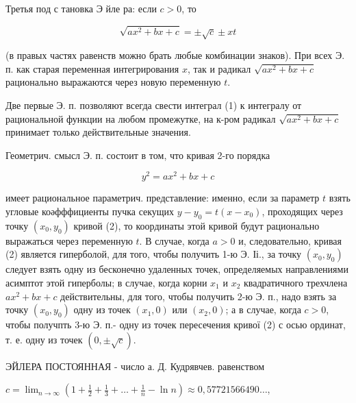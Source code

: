 \documentclass[10pt]{article}
\begin{document}
Третья под с тановка Э йле ра: если $c>0$, то



\[

\sqrt{a x^{2}+b x+c}= \pm \sqrt{c} \pm x t

\]



(в правых частях равенств можно брать любые комбинации знаков). При всех Э. п. как старая переменная интегрирования $x$, так и радикал $\sqrt{a x^{2}+b x+c}$ рационально выражаются через новую переменную $t$.



Две первые Э. п. позволяют всегда свести интеграл (1) к интегралу от рациональной функции на любом промежутке, на к-ром радикал $\sqrt{a x^{2}+b x+c}$ принимает только действительные значения.



Геометрич. смысл Э. п. состоит в том, что кривая 2-го порядка



\[

y^{2}=a x^{2}+b x+c

\]



имеет рациональное параметрич. представление: именно, если за параметр $t$ взять угловые коәфффициенты пучка секущих $y-y_{0}=t\left(x-x_{0}\right)$, проходящих через точку $\left(x_{0}, y_{0}\right)$ кривой (2), то координаты этой кривой будут рационально выражаться через переменную $t$. В случае, когда $a>0$ и, следовательно, кривая (2) является гиперболой, для того, чтобы получить 1-ю Э. Іі., за точку $\left(x_{0}, y_{0}\right)$ следует взять одну из бесконечно удаленных точек, определяемых направлениями асимптот этой гиперболы; в случае, когда корни $x_{1}$ и $x_{2}$ квадратичного трехчлена $a x^{2}+b x+c$ действительны, для того, чтобы получить 2-ю Э. п., надо взять за точку $\left(x_{0}, y_{0}\right)$ одну из точек $\left(x_{1}, 0\right)$ или $\left(x_{2}, 0\right)$; а в случае, когда $c>0$, чтобы получпть 3-ю Э. п.- одну из точек пересечения кривої (2) с осью ординат, т. е. одну из точек $(0, \pm \sqrt{c})$.



ЭЙЛЕРА ПОСТОЯННАЯ - число $а$. Д. Кудрявчев. равенством



$c=\lim _{n \rightarrow \infty}\left(1+\frac{1}{2}+\frac{1}{3}+\ldots+\frac{1}{n}-\ln n\right) \approx 0,57721566490 \ldots$,
\end{document}
